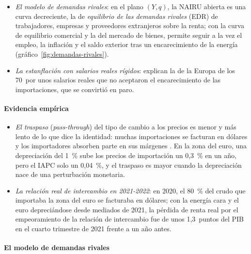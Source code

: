 \documentclass[11pt]{article}
\begin{document}
\begin{itemize}
\item \emph{El modelo de demandas rivales}: en el plano $(Y,q)$, la NAIRU abierta es una curva decreciente, la de \emph{equilibrio de las demandas rivales} (EDR) de trabajadores, empresas y proveedores extranjeros sobre la renta; con la curva de equilibrio comercial y la del mercado de bienes, permite seguir a la vez el empleo, la inflación y el saldo exterior tras un encarecimiento de la energía (gráfico~\ref{fig:demandas-rivales})\nocite{LayardNickellJackman1991Unemployment,CarlinSoskice2015Macroeconomics}.
\item \emph{La estanflación con salarios reales rígidos}: \textcite{BrunoSachs1985Economics} explican la de la Europa de los 70~por unos salarios reales que no aceptaron el encarecimiento de las importaciones, que se convirtió en paro.
\end{itemize}

\paragraph{Evidencia empírica}

\begin{itemize}
\item \emph{El traspaso} (\emph{pass-through}) del tipo de cambio a los precios es menor y más lento de lo que dice la identidad: muchas importaciones se facturan en dólares y los importadores absorben parte en sus márgenes\nocite{Gopinath2020DCP} . En la zona del euro, una depreciación del 1~\% sube los precios de importación un 0,3~\% en un año, pero el IAPC solo un 0,04~\%\nocite{OrtegaOsbat2020ERPT}, y el traspaso es mayor cuando la depreciación nace de una perturbación monetaria\nocite{ComunaleKunovac2017ERPT}.
\item \emph{La relación real de intercambio en 2021-2022}: en 2020, el 80~\% del crudo que importaba la zona del euro se facturaba en dólares; con la energía cara y el euro depreciándose desde mediados de 2021, la pérdida de renta real por el empeoramiento de la relación de intercambio fue de unos 1,3~puntos del PIB en el cuarto trimestre de 2021 frente a un año antes\nocite{GunnellaSchuler2022}.
\end{itemize}

\paragraph{El modelo de demandas rivales}
\end{document}
